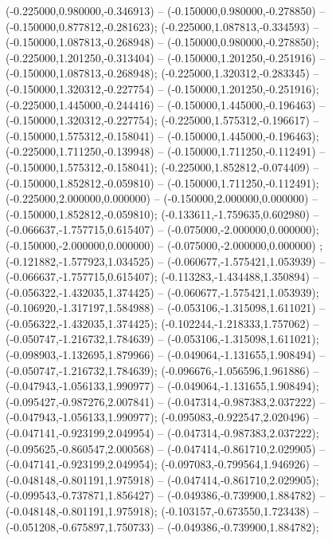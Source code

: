  (-0.225000,0.980000,-0.346913) -- (-0.150000,0.980000,-0.278850) -- (-0.150000,0.877812,-0.281623);
 (-0.225000,1.087813,-0.334593) -- (-0.150000,1.087813,-0.268948) -- (-0.150000,0.980000,-0.278850);
 (-0.225000,1.201250,-0.313404) -- (-0.150000,1.201250,-0.251916) -- (-0.150000,1.087813,-0.268948);
 (-0.225000,1.320312,-0.283345) -- (-0.150000,1.320312,-0.227754) -- (-0.150000,1.201250,-0.251916);
 (-0.225000,1.445000,-0.244416) -- (-0.150000,1.445000,-0.196463) -- (-0.150000,1.320312,-0.227754);
 (-0.225000,1.575312,-0.196617) -- (-0.150000,1.575312,-0.158041) -- (-0.150000,1.445000,-0.196463);
 (-0.225000,1.711250,-0.139948) -- (-0.150000,1.711250,-0.112491) -- (-0.150000,1.575312,-0.158041);
 (-0.225000,1.852812,-0.074409) -- (-0.150000,1.852812,-0.059810) -- (-0.150000,1.711250,-0.112491);
 (-0.225000,2.000000,0.000000) -- (-0.150000,2.000000,0.000000) -- (-0.150000,1.852812,-0.059810);
 (-0.133611,-1.759635,0.602980) -- (-0.066637,-1.757715,0.615407) -- (-0.075000,-2.000000,0.000000);
 (-0.150000,-2.000000,0.000000) -- (-0.075000,-2.000000,0.000000) ;
 (-0.121882,-1.577923,1.034525) -- (-0.060677,-1.575421,1.053939) -- (-0.066637,-1.757715,0.615407);
 (-0.113283,-1.434488,1.350894) -- (-0.056322,-1.432035,1.374425) -- (-0.060677,-1.575421,1.053939);
 (-0.106920,-1.317197,1.584988) -- (-0.053106,-1.315098,1.611021) -- (-0.056322,-1.432035,1.374425);
 (-0.102244,-1.218333,1.757062) -- (-0.050747,-1.216732,1.784639) -- (-0.053106,-1.315098,1.611021);
 (-0.098903,-1.132695,1.879966) -- (-0.049064,-1.131655,1.908494) -- (-0.050747,-1.216732,1.784639);
 (-0.096676,-1.056596,1.961886) -- (-0.047943,-1.056133,1.990977) -- (-0.049064,-1.131655,1.908494);
 (-0.095427,-0.987276,2.007841) -- (-0.047314,-0.987383,2.037222) -- (-0.047943,-1.056133,1.990977);
 (-0.095083,-0.922547,2.020496) -- (-0.047141,-0.923199,2.049954) -- (-0.047314,-0.987383,2.037222);
 (-0.095625,-0.860547,2.000568) -- (-0.047414,-0.861710,2.029905) -- (-0.047141,-0.923199,2.049954);
 (-0.097083,-0.799564,1.946926) -- (-0.048148,-0.801191,1.975918) -- (-0.047414,-0.861710,2.029905);
 (-0.099543,-0.737871,1.856427) -- (-0.049386,-0.739900,1.884782) -- (-0.048148,-0.801191,1.975918);
 (-0.103157,-0.673550,1.723438) -- (-0.051208,-0.675897,1.750733) -- (-0.049386,-0.739900,1.884782);

